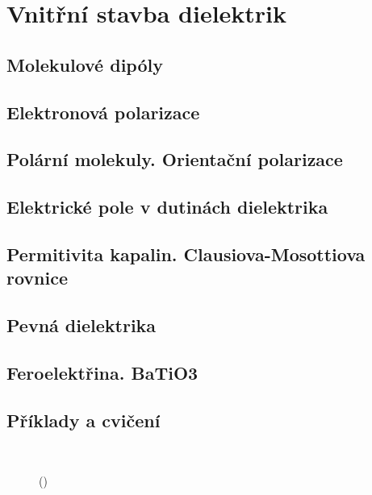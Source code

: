 \setchaptertoc
\chapter{Vnitřní stavba dielektrik}\label{fyz:IIchapXI}

  \section{Molekulové dipóly}\label{fyz:IIchapXIsecI}
  \section{Elektronová polarizace}\label{fyz:IIchapXIsecII}
  \section{Polární molekuly. Orientační polarizace}\label{fyz:IIchapXIsecIII}
  \section{Elektrické pole v dutinách dielektrika}\label{fyz:IIchapXIsecIV}
  \section{Permitivita kapalin. Clausiova-Mosottiova rovnice}\label{fyz:IIchapXIsecV}
  \section{Pevná dielektrika}\label{fyz:IIchapXIsecVI}
  \section{Feroelektřina. BaTiO3}\label{fyz:IIchapXIsecVII}
  \section{Příklady a cvičení}\label{fyz:IIchapXIsecVIII}

    \begin{figure}[ht!]
      \centering
                     \\
      \label{fyz:fig0714}
      \caption{
               (\cite[s.~748]{Feynman02})}
    \end{figure}

